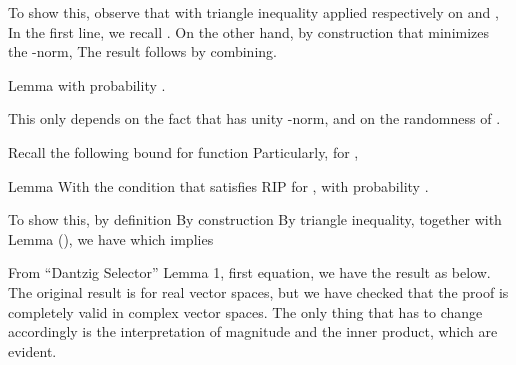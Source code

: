 To show this, observe that with triangle inequality applied respectively on  and ,
In the first line, we recall .
On the other hand, by construction that  minimizes the -norm,
The result follows by combining.

\Result
{Lemma}
{
with probability .
}

This only depends on the fact that  has unity -norm, and on the randomness of .

Recall the following bound for  function
Particularly, for ,

\Result
{Lemma}
{
With the condition that  satisfies RIP for ,
with probability .
}

To show this, by definition
By construction
By triangle inequality, together with Lemma (), we have
which implies

From ``Dantzig Selector'' Lemma 1, first equation, we have the result as below.
The original result is for real vector spaces, but we have checked that the proof is completely valid in complex vector spaces.
The only thing that has to change accordingly is the interpretation of magnitude and the inner product, which are evident.

